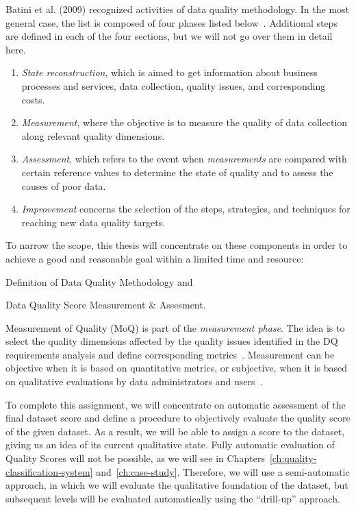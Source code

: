 Batini et al. (2009) recognized activities of data quality methodology.
In the most general case, the list is composed of four phases listed below~\cite{batini2009}.
Additional steps are defined in each of the four sections, but we will not go over them in detail here.
\begin{enumerate}
    \item \textit{State reconstruction}, which is aimed to get information about business processes and services, data collection, quality issues, and corresponding costs.
    \item \textit{Measurement}, where the objective is to measure the quality of data collection along relevant quality dimensions.
    \item \textit{Assessment}, which refers to the event when \textit{measurements} are compared with certain reference values to determine the state of quality and to assess the causes of poor data.
    \item \textit{Improvement} concerns the selection of the steps, strategies, and techniques for reaching new data quality targets.
\end{enumerate}

To narrow the scope, this thesis will concentrate on these components in order to achieve a good and reasonable goal within a limited time and resource:
\begin{enumerate*}[label=(\roman*)]
    \item Definition of Data Quality Methodology and
    \item Data Quality Score Measurement \& Assesment.
\end{enumerate*}

Measurement of Quality (MoQ) is part of the \textit{measurement phase}.
The idea is to select the quality dimensions affected by the quality issues identified in the DQ requirements analysis and define corresponding metrics~\cite{loshin2008}.
Measurement can be objective when it is based on quantitative metrics, or subjective, when it is based on qualitative evaluations by data administrators and users~\cite{loshin2008}.

To complete this assignment, we will concentrate on automatic assessment of the final dataset score and define a procedure to objectively evaluate the quality score of the given dataset.
As a result, we will be able to assign a score to the dataset, giving us an idea of its current qualitative state.
Fully automatic evaluation of Quality Scores will not be possible, as we will see in Chapters~\ref{ch:quality-classification-system} and~\ref{ch:case-study}.
Therefore, we will use a semi-automatic approach, in which we will evaluate the qualitative foundation of the dataset, but subsequent levels will be evaluated automatically using the \enquote{drill-up} approach.

